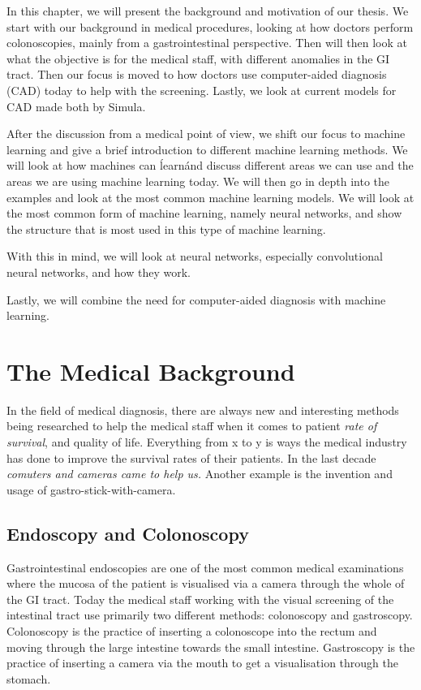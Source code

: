 In this chapter, we will present the background and motivation of our thesis.
We start with our background in medical procedures, looking at how doctors perform colonoscopies, mainly from a gastrointestinal perspective.
Then will then look at what the objective is for the medical staff, with different anomalies in the GI tract. Then our focus is moved to how doctors use computer-aided diagnosis (CAD) today to help with the screening. Lastly, we look at current models for CAD made both by Simula.

After the discussion from a medical point of view, we shift our focus to machine learning and give a brief introduction to different machine learning methods. We will look at how machines can \'learn\' and discuss different areas we can use and the areas we are using machine learning today.
We will then go in depth into the examples and look at the most common machine learning models. We will look at the most common form of machine learning, namely neural networks, and show the structure that is most used in this type of machine learning. 

 With this in mind, we will look
at neural networks, especially convolutional neural networks, and how they work.

Lastly, we will combine the need for computer-aided diagnosis with machine learning.

\section{The Medical Background}
In the field of medical diagnosis, there are always new and interesting methods being researched to help the medical staff when it comes to patient \textit{rate of survival}, and quality of life. 
Everything from x to y is ways the medical industry has done to improve the survival rates of their patients.
In the last decade \textit{comuters and cameras came to help us.}
Another example is the invention and usage of gastro-stick-with-camera.


\subsection{Endoscopy and Colonoscopy}
Gastrointestinal endoscopies are one of the most common medical examinations where the mucosa of the patient is visualised via a camera through the whole of the GI tract. \cite{Holme13}
Today the medical staff working with the visual screening of the intestinal tract use primarily two different methods: colonoscopy and gastroscopy. 
Colonoscopy is the practice of inserting a colonoscope into the rectum and moving through the large intestine towards the small intestine.  Gastroscopy is the practice of inserting a camera via the mouth to get a visualisation through the stomach.

